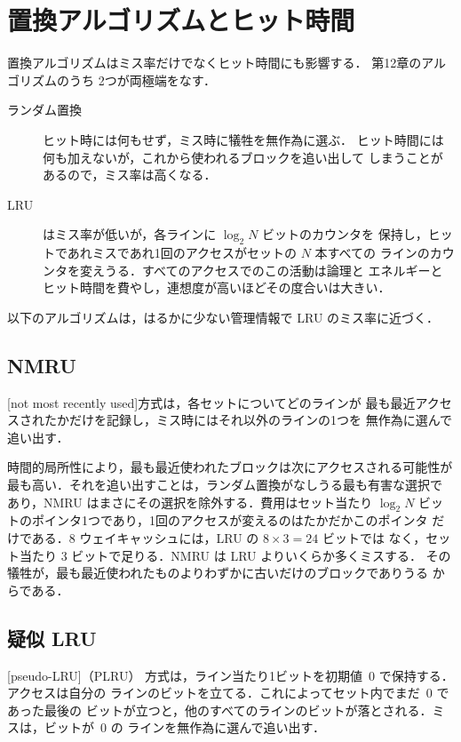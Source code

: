 \documentclass[../main.tex]{subfiles}
\begin{document}
\section{置換アルゴリズムとヒット時間}
\label{sec:l14-replacement}

置換アルゴリズムはミス率だけでなくヒット時間にも影響する．
第12章のアルゴリズムのうち
2つが両極端をなす．
\begin{description}
  \item[ランダム置換] ヒット時には何もせず，ミス時に犠牲を無作為に選ぶ．
    ヒット時間には何も加えないが，これから使われるブロックを追い出して
    しまうことがあるので，ミス率は高くなる．
  \item[LRU] はミス率が低いが，各ラインに $\log_2 N$ ビットのカウンタを
    保持し，ヒットであれミスであれ1回のアクセスがセットの $N$ 本すべての
    ラインのカウンタを変えうる．すべてのアクセスでのこの活動は論理と
    エネルギーとヒット時間を費やし，連想度が高いほどその度合いは大きい．
\end{description}
以下のアルゴリズムは，はるかに少ない管理情報で LRU のミス率に近づく．

\subsection{NMRU}

\begin{definition}[NMRU]
  [not most recently used]方式は，各セットについてどのラインが
  最も最近アクセスされたかだけを記録し，ミス時にはそれ以外のラインの1つを
  無作為に選んで追い出す．
\end{definition}

時間的局所性により，最も最近使われたブロックは次にアクセスされる可能性が
最も高い．それを追い出すことは，ランダム置換がなしうる最も有害な選択で
あり，NMRU はまさにその選択を除外する．費用はセット当たり $\log_2 N$
ビットのポインタ1つであり，1回のアクセスが変えるのはたかだかこのポインタ
だけである．8 ウェイキャッシュには，LRU の $8 \times 3 = 24$ ビットでは
なく，セット当たり 3 ビットで足りる．NMRU は LRU よりいくらか多くミスする．
その犠牲が，最も最近使われたものよりわずかに古いだけのブロックでありうる
からである．

\subsection{疑似 LRU}

\begin{definition}[PLRU]
  [pseudo-LRU]（PLRU）
  方式は，ライン当たり1ビットを初期値~0 で保持する．%
  アクセスは自分の
  ラインのビットを立てる．これによってセット内でまだ~0 であった最後の
  ビットが立つと，他のすべてのラインのビットが落とされる．ミスは，ビットが~0 の
  ラインを無作為に選んで追い出す．
\end{definition}
\end{document}
